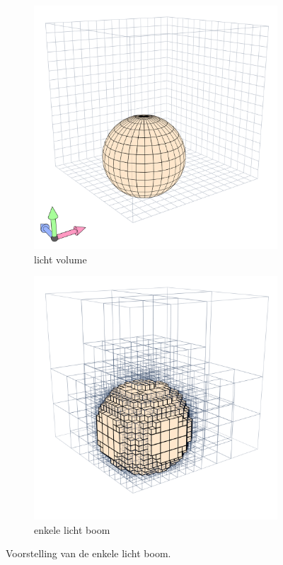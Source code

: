\begin{figure}
  \centering
  \begin{subfigure}[b]{.45\linewidth}
    \includegraphics[width=\textwidth]{./img/raw/hs-slt_left.png}%
    \caption{licht volume}%
    \label{fig:hs-slt-left}%
  \end{subfigure}
  \begin{subfigure}[b]{.45\linewidth}%
    \includegraphics[width=\textwidth]{./img/raw/hs-slt_right.png}%
    \caption{enkele licht boom}%
    \label{fig:hs-slt-right}%
  \end{subfigure}
  \caption{Voorstelling van de enkele licht boom.}
  \label{fig:hs-slt}
\end{figure}
